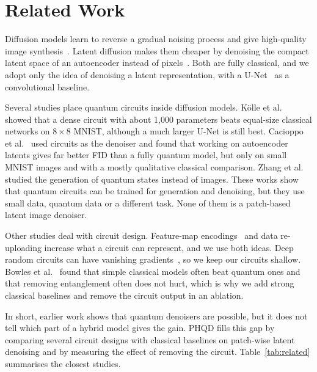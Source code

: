 \section{Related Work}\label{sec:related}
Diffusion models learn to reverse a gradual noising process and give high-quality image synthesis~\cite{ho}. Latent diffusion makes them cheaper by denoising the compact latent space of an autoencoder instead of pixels~\cite{rombach}. Both are fully classical, and we adopt only the idea of denoising a latent representation, with a U-Net~\cite{unet} as a convolutional baseline.

Several studies place quantum circuits inside diffusion models. K\"olle et al.~\cite{kolle} showed that a dense circuit with about 1,000 parameters beats equal-size classical networks on $8\times8$ MNIST, although a much larger U-Net is still best. Cacioppo et al.~\cite{cacioppo} used circuits as the denoiser and found that working on autoencoder latents gives far better FID than a fully quantum model, but only on small MNIST images and with a mostly qualitative classical comparison. Zhang et al.~\cite{zhang} studied the generation of quantum states instead of images. These works show that quantum circuits can be trained for generation and denoising, but they use small data, quantum data or a different task. None of them is a patch-based latent image denoiser.

Other studies deal with circuit design. Feature-map encodings~\cite{havlicek} and data re-uploading increase what a circuit can represent, and we use both ideas. Deep random circuits can have vanishing gradients~\cite{mcclean}, so we keep our circuits shallow. Bowles et al.~\cite{bowles} found that simple classical models often beat quantum ones and that removing entanglement often does not hurt, which is why we add strong classical baselines and remove the circuit output in an ablation.

In short, earlier work shows that quantum denoisers are possible, but it does not tell which part of a hybrid model gives the gain. PHQD fills this gap by comparing several circuit designs with classical baselines on patch-wise latent denoising and by measuring the effect of removing the circuit. Table~\ref{tab:related} summarises the closest studies.

